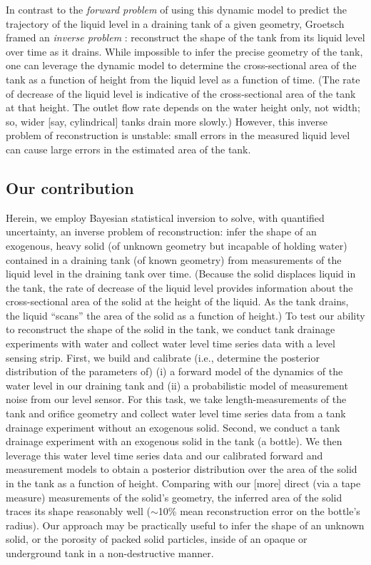 \documentclass[openacc]{rsproca_new}%
\begin{document}
In contrast to the \emph{forward problem} of using this dynamic model to predict the trajectory of the liquid level in a draining tank of a given geometry, Groetsch \cite{groetsch1993inverse,groetsch1999inverse} framed an \emph{inverse problem} \cite{groetsch1993inverse,neto2012introduction,tarantola2005inverse}: reconstruct the shape of the tank from its liquid level over time as it drains. 
While impossible to infer the precise geometry of the tank, one can leverage the dynamic model to determine the cross-sectional area of the tank as a function of height from the liquid level as a function of time. (The rate of decrease of the liquid level is indicative of the cross-sectional area of the tank at that height. The outlet flow rate depends on the water height only, not width; so, wider [say, cylindrical] tanks drain more slowly.)
However, this inverse problem of reconstruction is unstable: small errors in the measured liquid level can cause large errors in the estimated area of the tank. \cite{groetsch1993inverse}

\subsection{Our contribution}
Herein, we employ Bayesian statistical inversion \cite{calvetti2018inverse,waqar2023tutorial,kaipio2006statistical,dashti2013bayesian} to solve, with quantified uncertainty, an inverse problem of reconstruction: infer the shape of an exogenous, heavy solid (of unknown geometry but incapable of holding water) contained in a draining tank (of known geometry) from measurements of the liquid level in the draining tank over time.
(Because the solid displaces liquid in the tank, the rate of decrease of the liquid level provides information about the cross-sectional area of the solid at the height of the liquid.
As the tank drains, the liquid ``scans'' the area of the solid as a function of height.)
To test our ability to reconstruct the shape of the solid in the tank, we conduct tank drainage experiments with water and collect water level time series data with a level sensing strip. First, we build and calibrate (i.e., determine the posterior distribution of the parameters of) (i) a forward model of the dynamics of the water level in our draining tank and (ii) a probabilistic model of measurement noise from our level sensor.
For this task, we take length-measurements of the tank and orifice geometry and collect water level time series data from a tank drainage experiment without an exogenous solid. 
Second, we conduct a tank drainage experiment with an exogenous solid in the tank (a bottle). We then leverage this water level time series data and our calibrated forward and measurement models to obtain a posterior distribution over the area of the solid in the tank as a function of height.
Comparing with our [more] direct (via a tape measure) measurements of the solid's geometry, the inferred area of the solid traces its shape reasonably well ($\sim$10\% mean reconstruction error on the bottle's radius). Our approach may be practically useful to infer the shape of an unknown solid, or the porosity of packed solid particles, inside of an opaque or underground tank in a non-destructive manner.
\end{document}
